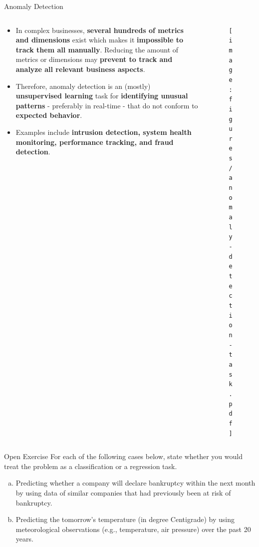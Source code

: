\documentclass[document.tex]{subfiles}
\begin{document}
    \begin{frame}{Anomaly Detection}
        \begin{columns}
            \begin{column}{.6\textwidth}
                \begin{itemize}
                    \item In complex businesses, \textbf{several hundreds of metrics and dimensions} exist which makes it \textbf{impossible to track them all manually}. Reducing the amount of metrics or dimensions may \textbf{prevent to track and analyze all relevant business aspects}.
                    \item Therefore, anomaly detection is an (mostly) \textbf{unsupervised learning} task for \textbf{identifying unusual patterns} - preferably in real-time - that do not conform to \textbf{expected behavior}.
                    \item Examples include \textbf{intrusion detection, system health monitoring, performance tracking, and fraud detection}.
                \end{itemize}
            \end{column}
            \begin{column}{.4\textwidth}
                \begin{figure}
                    \label{fig:anomaly-detection-task}
                    \texttt{[image: figures/anomaly-detection-task.pdf]}
                \end{figure}
            \end{column}
        \end{columns}
    \end{frame}

    \begin{frame}{Open Exercise }
        For each of the following cases below, state whether you would treat the problem as a classification or a regression task.

        \begin{enumerate}[a)]
            \item Predicting whether a company will declare bankruptcy within the next month by using data of similar companies that had previously been at risk of bankruptcy.
            \item Predicting the tomorrow's temperature (in degree Centigrade) by using meteorological observations (e.g., temperature, air pressure) over the past 20 years.
        \end{enumerate}
    \end{frame}	
\end{document}
